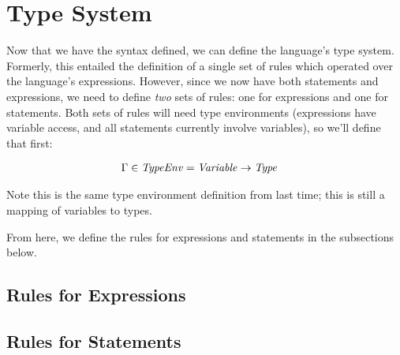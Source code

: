 \section{Type System}
Now that we have the syntax defined, we can define the language's type system.
Formerly, this entailed the definition of a single set of rules which operated over the language's expressions.
However, since we now have both statements and expressions, we need to define \emph{two} sets of rules: one for expressions and one for statements.
Both sets of rules will need type environments (expressions have variable access, and all statements currently involve variables), so we'll define that first:

\begin{align*}
  \Gamma \in \mathit{TypeEnv} &= \mathit{Variable} \to \mathit{Type}
\end{align*}

\noindent
Note this is the same type environment definition from last time; this is still a mapping of variables to types.

From here, we define the rules for expressions and statements in the subsections below.

\subsection{Rules for Expressions}

\subsection{Rules for Statements}
